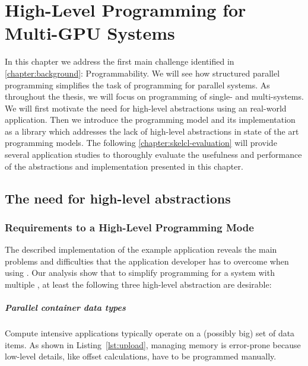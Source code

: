 
\chapter{High-Level Programming for Multi-GPU Systems}

\label{chapter:skelcl}

In this chapter we address the first main challenge identified in \autoref{chapter:background}: Programmability.
We will see how structured parallel programming simplifies the task of programming for parallel systems.
As throughout the thesis, we will focus on programming of single- and multi-\GPU systems.
We will first motivate the need for high-level abstractions using an real-world \OpenCL application.
Then we introduce the \emph{\SkelCL} programming model and its implementation as a \Cpp library which addresses the lack of high-level abstractions in state of the art \GPU programming models.
The following \autoref{chapter:skelcl-evaluation} will provide several application studies to thoroughly evaluate the usefulness and performance of the abstractions and implementation presented in this chapter.


\section{The need for high-level abstractions}
\label{section:opencl-example}

\subsection{Requirements to a High-Level Programming Mode}
\label{section:requirements}
The described implementation of the example application reveals the main problems and difficulties that the application developer has to overcome when using \OpenCL.
Our analysis show that to simplify programming for a system with multiple \GPUs, at least the following three high-level abstraction are desirable:

\paragraph{Parallel container data types}
Compute intensive applications typically operate on a (possibly big) set of data items.
As shown in Listing~\ref{lst:upload}, managing memory is error-prone because low-level details, like offset calculations, have to be programmed manually.

